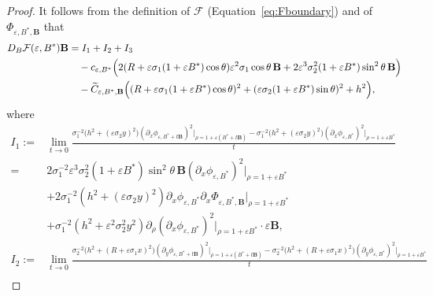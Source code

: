 \documentclass[12pt,reqno]{amsart}
\numberwithin{equation}{section}
\theoremstyle{definition}
\theoremstyle{remark}
\newtheorem{remark}[theorem]{Remark}
\begin{document}

\begin{proof}
 

It follows from the definition of $\mathcal{F}$ (Equation~\eqref{eq:Fboundary}) and of $\Phi_{\varepsilon,B^*,\textbf{B}}$ that
\begin{align*}
D_B\mathcal F(\varepsilon,B^*)  \textbf{B} 
&=I_1+I_2+I_3 \\
&\quad -c_{\varepsilon,B^*}\Bigl(
2(R+\varepsilon\sigma_1(1+\varepsilon B^*)\cos\theta)\varepsilon^2\sigma_1 \cos\theta\, \textbf{B}
+2\varepsilon^3\sigma_2^2(1+\varepsilon B^*)\sin^2\theta\,  \textbf{B}\Bigr) \\
&\quad -\widetilde C_{\varepsilon,B^*,\textbf{B}}
\Bigl((R+\varepsilon\sigma_1(1+\varepsilon B^*)\cos\theta)^2+(\varepsilon\sigma_2(1+\varepsilon B^*)\sin\theta)^2+h^2\Bigr), 
\end{align*}
where
\begin{align*}
I_1:=&\lim_{t\to0}\frac{
	\sigma_1^{-2}\bigl(h^2+(\varepsilon\sigma_2y)^2\bigr)(\partial_x\phi_{\varepsilon,B^*+t  \textbf{B}})^2\big|_{\rho=1+\varepsilon(B^*+t  \textbf{B})}-
	\sigma_1^{-2}\bigl(h^2+(\varepsilon\sigma_2y)^2\bigr)(\partial_x\phi_{\varepsilon,B^*})^2\big|_{\rho=1+\varepsilon B^*}}{t}  \\
=&2\sigma_1^{-2}\varepsilon^3 \sigma_2^2\left(1+\varepsilon B^*\right) \sin ^2 \theta\,  \textbf{B}\left(\partial_x \phi_{\varepsilon, B^*}\right)^2\big|_{\rho=1+\varepsilon B^*}\\
&+2\sigma_1^{-2}\left(h^2+\left(\varepsilon \sigma_2 y\right)^2\right)    \partial_x \phi_{\varepsilon, B^*} \partial_x \Phi_{\varepsilon, B^*, \textbf{B}}\big|_{\rho=1+\varepsilon B^*} \\
& +\sigma_1^{-2}\left(h^2+\varepsilon^2 \sigma_2^2 y^2\right) \partial_\rho\left(\partial_x \phi_{\varepsilon, B^*}\right)^2\big|_{\rho=1+\varepsilon B^*} \cdot \varepsilon \textbf{B},\\
I_2:=&\lim_{t\to0}\frac{
	\sigma_2^{-2}\bigl(h^2+(R+\varepsilon\sigma_1x)^2\bigr)(\partial_y\phi_{\varepsilon,B^*+t  \textbf{B}})^2\big|_{\rho=1+\varepsilon(B^*+t  \textbf{B})}-
	\sigma_2^{-2}\bigl(h^2+(R+\varepsilon\sigma_1x)^2\bigr)(\partial_y\phi_{\varepsilon,B^*})^2\big|_{\rho=1+\varepsilon B^*}}{t}  \\

\end{align*}
\end{proof}
\end{document}

